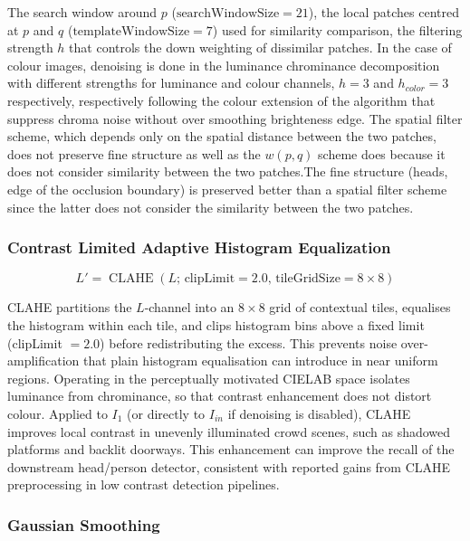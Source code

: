 \documentclass[12pt,a4paper]{report}
\begin{document}
The search window around $p$ ($\text{searchWindowSize}=21$), the local patches centred at $p$ and $q$ ($\text{templateWindowSize}=7$) used for similarity comparison, the filtering strength $h$ that controls the down weighting of dissimilar patches. In the case of colour images, denoising is done in the luminance chrominance decomposition with different strengths for luminance and colour channels, $h=3$ and $h_{color}=3$ respectively, respectively following the colour extension of the algorithm that suppress chroma noise without over smoothing brighteness edge. The spatial filter scheme, which depends only on the spatial distance between the two patches, does not preserve fine structure as well as the $w(p,q)$ scheme does because it does not consider similarity between the two patches.The fine structure (heads, edge of the occlusion boundary) is preserved better than a spatial filter scheme since the latter does not consider the similarity between the two patches. 

\subsubsection{Contrast Limited Adaptive Histogram Equalization}

\begin{equation}
	L' =
	\operatorname{CLAHE}\left(
	L;\,\text{clipLimit}=2.0,\,
	\text{tileGridSize}=8\times8
	\right)
	\label{eq:clahe}
\end{equation}

CLAHE partitions the $L$-channel into an $8\times8$ grid of contextual tiles, equalises the histogram within each tile, and clips histogram bins above a fixed limit (clipLimit $=2.0$) before redistributing the excess. This prevents noise over-amplification that plain histogram equalisation can introduce in near uniform regions. Operating in the perceptually motivated CIELAB space isolates luminance from chrominance, so that contrast enhancement does not distort colour. Applied to $I_1$ (or directly to $I_{in}$ if denoising is disabled), CLAHE improves local contrast in unevenly illuminated crowd scenes, such as shadowed platforms and backlit doorways. This enhancement can improve the recall of the downstream head/person detector, consistent with reported gains from CLAHE preprocessing in low contrast detection pipelines.

\subsubsection{Gaussian Smoothing}
\end{document}
